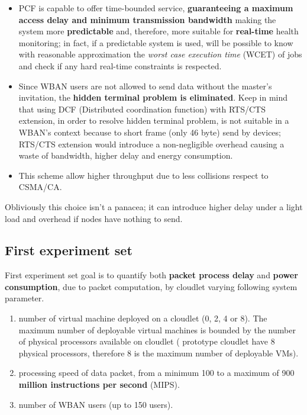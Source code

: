 \documentclass[sigchi]{acmart}
\begin{document}
\begin{itemize}

\item PCF is capable to offer time-bounded service, \textbf{guaranteeing a maximum access delay and minimum transmission bandwidth} making the system more \textbf{predictable} and, therefore, more suitable for \textbf{real-time} health monitoring; in fact, if a predictable system is used, will be possible to know with reasonable approximation the \textit{worst case execution time} (WCET) of jobs and check if any hard real-time constraints is respected.

\item Since WBAN users are not allowed to send data without the master's invitation, the \textbf{hidden terminal problem is eliminated}. Keep in mind that using DCF (Distributed coordination function) with RTS/CTS extension, in order to resolve hidden terminal problem, is not suitable in a WBAN's context because to short frame (only 46 byte) send by devices; RTS/CTS extension would introduce a non-negligible overhead causing a waste of bandwidth, higher delay and energy consumption.\cite{schiller2003mobile}

\item This scheme allow higher throughput due to less collisions respect to CSMA/CA.\cite{schiller2003mobile}

\end{itemize}

Obliviously this choice isn't a panacea; it can introduce higher delay under a light load and overhead if nodes have nothing to send.\cite{schiller2003mobile}

\subsection{First experiment set}

First experiment set goal is to quantify both \textbf{packet process delay} and \textbf{power consumption}, due to packet computation, by cloudlet varying following system parameter.

\begin{enumerate}

\item number of virtual machine deployed on a cloudlet (0, 2, 4 or 8). The maximum number of deployable virtual machines is bounded by the number of physical processors available on cloudlet (\citet{MSAReport} prototype cloudlet have 8 physical processors, therefore 8 is the maximum number of deployable VMs).
 
\item processing speed of data packet, from a minimum 100 to a maximum of 900 \textbf{million instructions per second} (MIPS).

\item number of WBAN users (up to 150 users).

\end{enumerate}
\end{document}
